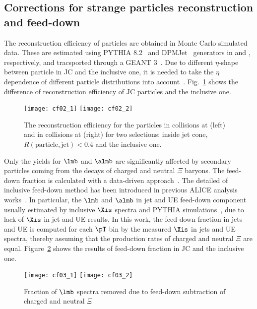 \documentclass[ALICE,manyauthors]{cernphprep}
\begin{document}
\subsection{Corrections for strange particles reconstruction and feed-down}
\label{SubSec:Correction}
The reconstruction efficiency of particles are obtained in Monte Carlo simulated data.
These are estimated using PYTHIA 8.2~\cite{Sjostrand:2014zea} and DPMJet~\cite{Roesler:2000he} generators in \pp and \pPb, respectively, and tracsported through a GEANT 3~\cite{Brun:1994aa}.
Due to different $\eta$-shape between particle in JC and the inclusive one, it is needed to take the $\eta$ dependence of different particle distributions into account~\cite{Acharya:2021oaa}.
Fig.~\ref{fig:EffiJCIncl} shows the difference of reconstruction efficiency of JC particles and the inclusive one.
\begin{figure}[!ht]
	\begin{center}
		\texttt{[image: cf02\_1]}
		\texttt{[image: cf02\_2]}
	\end{center}
	\caption{The reconstruction efficiency for the particles in \pp collisions at \thirteen (left) and in \pPb collisions at \fivenn (right) for two selections: inside jet cone, $R(\mathrm{particle, jet}) < 0.4$ and the inclusive one.}
	\label{fig:EffiJCIncl}
\end{figure}

Only the yields for $\lmb$ and $\almb$ are significantly affected by secondary particles coming from the decays of charged and neutral $\Xi$ baryons.
The feed-down fraction is calculated with a data-driven approach~\cite{Abelev:2013haa}.
The detailed of inclusive feed-down method has been introduced in previous ALICE analysis works~\cite{Acharya:2019kyh, Acharya:2020uxl, ALICE:2017jyt}.
In particular, the $\lmb$ and $\almb$ in jet and UE feed-down component usually estimated by inclusive $\Xis$ spectra and PYTHIA simulations~\cite{Acharya:2021oaa}, due to lack of $\Xis$ in jet and UE results.
In this work, the feed-down fraction in jets and UE is computed for each $\pT$ bin by the measured $\Xis$ in jets and UE spectra, thereby assuming that the production rates of charged and neutral $\Xi$ are equal.
Figure~\ref{fig:FdFrac} shows the results of feed-down fraction in JC and the inclusive one.
\begin{figure}[!ht]
	\begin{center}
		\texttt{[image: cf03\_1]}
		\texttt{[image: cf03\_2]}
	\end{center}
	\caption{Fraction of $\lmb$ spectra removed due to feed-down subtraction of charged and neutral $\Xi$}
	\label{fig:FdFrac}
\end{figure}
\end{document}

